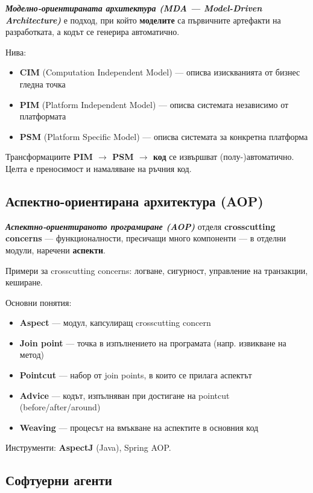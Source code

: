 \documentclass{scrartcl}
\begin{document}
\begin{FlushLeft}
\textbf{\textit{Моделно-ориентираната архитектура (MDA — Model-Driven Architecture)}} е подход,
при който \textbf{моделите} са първичните артефакти на разработката, а кодът се генерира автоматично.

Нива:
\begin{itemize}
    \item \textbf{CIM} (Computation Independent Model) — описва изискванията от бизнес гледна точка
    \item \textbf{PIM} (Platform Independent Model) — описва системата независимо от платформата
    \item \textbf{PSM} (Platform Specific Model) — описва системата за конкретна платформа
\end{itemize}

Трансформациите \textbf{PIM $\rightarrow$ PSM $\rightarrow$ код} се извършват (полу-)автоматично.
Целта е преносимост и намаляване на ръчния код.

\subsection{Аспектно-ориентирана архитектура (AOP)}

\textbf{\textit{Аспектно-ориентираното програмиране (AOP)}} отделя \textbf{crosscutting concerns} —
функционалности, пресичащи много компоненти — в отделни модули, наречени \textbf{аспекти}.

Примери за crosscutting concerns: логване, сигурност, управление на транзакции, кеширане.

Основни понятия:
\begin{itemize}
    \item \textbf{Aspect} — модул, капсулиращ crosscutting concern
    \item \textbf{Join point} — точка в изпълнението на програмата (напр. извикване на метод)
    \item \textbf{Pointcut} — набор от join points, в които се прилага аспектът
    \item \textbf{Advice} — кодът, изпълняван при достигане на pointcut (before/after/around)
    \item \textbf{Weaving} — процесът на вмъкване на аспектите в основния код
\end{itemize}

Инструменти: \textbf{AspectJ} (Java), Spring AOP.

\subsection{Софтуерни агенти}


\end{FlushLeft}
\end{document}
